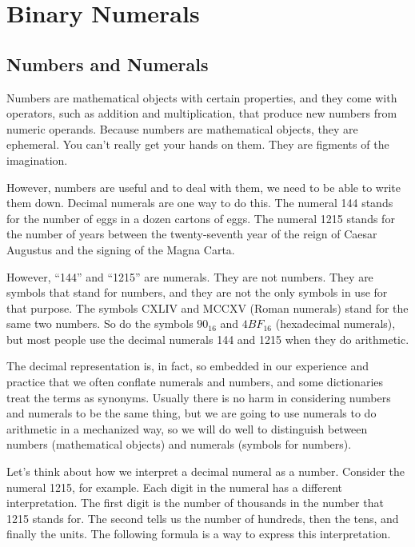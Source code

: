 \chapter{Binary Numerals}
\label{ch:binary-numerals}
\section{Numbers and Numerals}
\label{sec:numbers-numerals}
Numbers are mathematical objects with certain properties,
and they come with operators, such as addition
and multiplication, that produce new numbers from numeric
operands.
Because numbers are mathematical objects, they are ephemeral.
You can't really get your hands on them.
They are figments of the imagination.

However, numbers are useful and to deal with them,
we need to be able to write them down.
Decimal numerals are one way to do this.
The numeral 144 stands for the number
of eggs in a dozen cartons of eggs.
The numeral 1215 stands for the number of
years between the twenty-seventh year of the reign
of Caesar Augustus and the signing of the Magna Carta.

However, ``144'' and ``1215'' are numerals.
They are not numbers. They are symbols that stand for numbers,
and they are not the only symbols in use for that purpose.
The symbols CXLIV and MCCXV (Roman numerals) stand for the same two numbers.
So do the symbols $90_{16}$ and $4BF_{16}$ (hexadecimal numerals),
but most people use the decimal numerals 144 and 1215 when they do arithmetic.

The decimal representation is, in fact, so embedded in
our experience and practice that we often conflate
numerals and numbers, and some dictionaries treat the terms as synonyms.
Usually there is no harm in considering numbers and numerals
to be the same thing, but we are going to use numerals
to do arithmetic in a mechanized way, so we will
do well to distinguish between
numbers (mathematical objects)
and numerals (symbols for numbers).

Let's think about how we interpret a decimal numeral as a number.
Consider the numeral 1215, for example.
Each digit in the numeral has a different interpretation.
The first digit is the number of thousands in the number
that 1215 stands for. The second tells us the number
of hundreds, then the tens, and finally the units.
The following formula is a way to express this interpretation.

